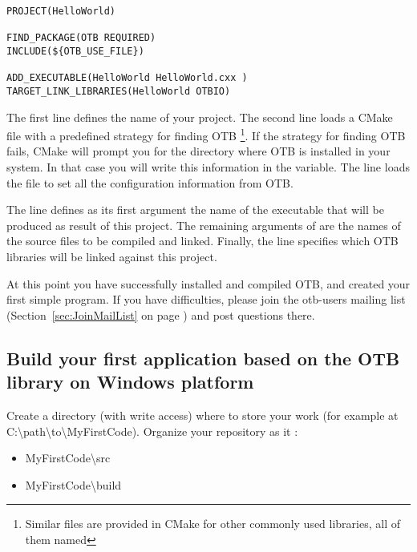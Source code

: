 \small
\begin{verbatim}
PROJECT(HelloWorld)

FIND_PACKAGE(OTB REQUIRED)
INCLUDE(${OTB_USE_FILE})

ADD_EXECUTABLE(HelloWorld HelloWorld.cxx )
TARGET_LINK_LIBRARIES(HelloWorld OTBIO)
\end{verbatim}

\normalsize

The first line defines the name of your project. The second line loads a CMake file with a predefined strategy for finding OTB \footnote{Similar files are provided in CMake for other commonly used libraries, all of them named }. If the strategy for finding OTB fails, CMake will prompt you for the directory where OTB is installed in your system. In that case you will write this information in the  variable. The line  loads the  file to set all the configuration information from OTB.

The line  defines as its first argument the name of the executable that will be produced as result of this project. The remaining arguments of  are the names of the source files to be compiled and linked.  Finally, the  line specifies which OTB libraries will be linked against this project.



At this point you have successfully installed and compiled OTB, and created your first simple program. If you have difficulties, please join the otb-users mailing list (Section~\ref{sec:JoinMailList} on page \pageref{sec:JoinMailList}) and post questions there.


\subsection{Build your first application based on the OTB library on Windows platform}
\label{sec:FirstWinAppOTB}

Create a directory (with write access) where to store your work (for example at C:\textbackslash path\textbackslash to\textbackslash MyFirstCode).
Organize your repository as it :
\begin{itemize}
\item MyFirstCode\textbackslash src
\item MyFirstCode\textbackslash build
\end{itemize}

